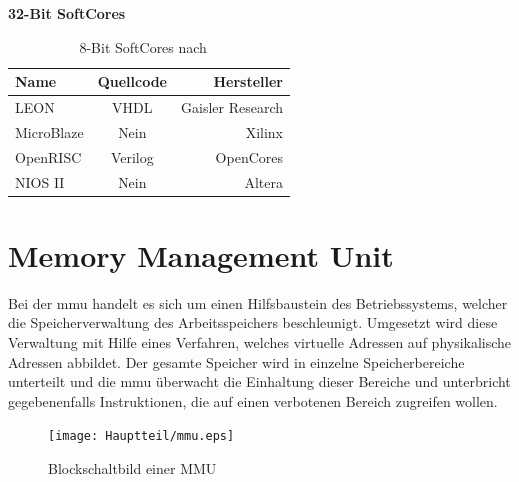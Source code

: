    \textbf{32-Bit SoftCores}\\
    \begin{table}[H]
    \centering
    \begin{tabular}{|l|c|r|}
      \hline
    \textbf{Name} & \textbf{Quellcode} & \textbf{Hersteller}\\
      \hline
      LEON & VHDL & Gaisler Research\\
      \hline
      MicroBlaze & Nein & Xilinx\\
      \hline
      OpenRISC & Verilog & OpenCores\\
      \hline
      NIOS II & Nein & Altera\\
      \hline
    \end{tabular}
      \caption{8-Bit SoftCores nach ~\cite{softcore}}
     \label{tab:8bitsysteme}
      \end{table}










\section{Memory Management Unit}\label{kap:mmu}

Bei der \ac{mmu} handelt es sich um einen Hilfsbaustein des Betriebssystems, welcher die Speicherverwaltung des Arbeitsspeichers beschleunigt. Umgesetzt wird diese Verwaltung mit
Hilfe eines Verfahren, welches virtuelle Adressen auf physikalische Adressen abbildet. Der gesamte Speicher wird in einzelne Speicherbereiche unterteilt und die
\ac{mmu} überwacht die Einhaltung dieser Bereiche und unterbricht gegebenenfalls Instruktionen, die auf einen verbotenen
Bereich zugreifen wollen.\cite{itwissen}\\

\begin{figure}[H]
\centering
\texttt{[image: Hauptteil/mmu.eps]}
\caption{Blockschaltbild einer MMU}\label{fig:mmu}
\end{figure}


